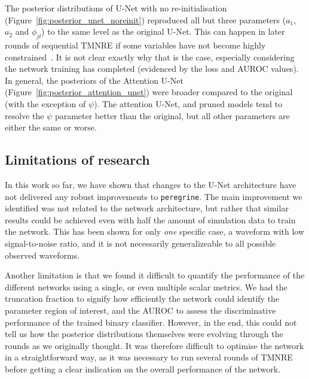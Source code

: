 The posterior distributions of U-Net with no re-initialisation (Figure~\ref{fig:posterior_unet_noreinit})  reproduced all but three parameters ($a_1$, $a_2$ and $\phi_{jl}$) to the same level as the original U-Net. This can happen in later rounds of sequential TMNRE if some variables have not become highly constrained~\cite{Karchev_Trotta_Weniger_2023}. It is not clear exactly why that is the case, especially considering the network training has completed (evidenced by the loss and AUROC values).
In general, the posteriors of the Attention U-Net (Figure~\ref{fig:posterior_attention_unet}) were broader compared to the original (with the exception of $\psi$). The attention U-Net, and pruned models tend to resolve the $\psi$ parameter better than the original, but all other parameters are either the same or worse.




\subsection{Limitations of research}

In this work so far, we have shown that changes to the U-Net architecture have not delivered any robust improvements to \texttt{peregrine}. The main improvement we identified was not related to the network architecture, but rather that similar results could be achieved even with half the amount of simulation data to train the network. This has been shown for only \textit{one} specific case, a waveform with low signal-to-noise ratio, and it is not necessarily generalizeable to all possible observed waveforms.

Another limitation is that we found it difficult to quantify the performance of the different networks using a single, or even multiple scalar metrics. We had the truncation fraction to signify how efficiently the network could identify the parameter region of interest, and the AUROC to assess the discriminative performance of the trained binary classifier. However, in the end, this could not tell us how the posterior distributions themselves were evolving through the rounds as we originally thought. It was therefore difficult to optimise the network in a straightforward way, as it was necessary to run several rounds of TMNRE before getting a clear indication on the overall performance of the network.

